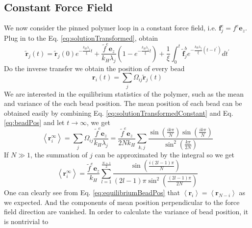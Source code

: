 \documentclass[12pt,a4paper]{article}
\begin{document}
\subsection{Constant Force Field}
\label{sub:constantForceField}
We now consider the pinned polymer loop in a constant force field, i.e.
$\mathbf{f}_j^e = f^e \mathbf{e}_z$. Plug in to the Eq.
\eqref{eq:solutionTransformed}, obtain
\begin{equation}
    \label{eq:solutionTransformedConstant}
    \tilde{\mathbf{r}}_j(t) = \tilde{\mathbf{r}}_j(0) e^{-\frac{k_H
            \lambda_j}{\xi} t} + \frac{\tilde{f}^e\mathbf{e}_z}{k_H
        \lambda_j}\left(1-e^{-\frac{k_H \lambda_j}{\xi} t} \right)
    +\frac{1}{\xi} \int^t_0{\tilde{\mathbf{f}}^b_j e^{-\frac{k_H \lambda_j}{\xi}
            (t -t^\prime)} }dt^{\prime}
\end{equation}
Do the inverse transfer we obtain the position of every bead
\begin{equation}
    \label{eq:beadPos}
    \mathbf{r}_i (t) = \sum_j \Omega_{ij} \tilde{\mathbf{r}}_j(t)
\end{equation}
We are interested in the equilibrium statistics of the polymer, such as the mean
and variance of the each bead position. The mean position of each bead can be
obtained easily by combining Eq.  \eqref{eq:solutionTransformedConstant} and Eq.
\eqref{eq:beadPos} and let $t\rightarrow\infty$, we get 
\begin{equation}
    \label{eq:equilibriumBeadPosRaw}
    \left<\mathbf{r}_i^\infty\right> = \sum_j \Omega_{ij}
    \frac{\tilde{f}^e\mathbf{e}_z}{k_H \lambda_j} =
    \frac{\tilde{f}^e\mathbf{e}_z}{2 N k_H}\sum_{k,j}
    \frac{\sin\left(\frac{ik\pi}{N}\right)\sin\left(\frac{ik\pi}{N}\right)}
    {\sin^2\left(\frac{k\pi}{2N}\right)}
\end{equation}
If $N\gg 1$, the summation of $j$ can be approximated by the integral so we get
\begin{equation}
    \label{eq:equilibriumBeadPos}
    \left<\mathbf{r}_i^\infty\right> = 
    \frac{\tilde{f}^e\mathbf{e}_z}{k_H}
    \sum_{l=1}^{\frac{N+1}{2}}\frac{\sin\left(\frac{i(2l-1)\pi}{N}\right)}
    {(2l-1)\pi\sin^2\left(\frac{(2l-1)\pi}{2N}\right)}
\end{equation}
One can clearly see from Eq. \eqref{eq:equilibriumBeadPos} that
$\left<\mathbf{r}_i\right> = \left<\mathbf{r}_{N-i}\right>$ as we expected. And
the components of mean position perpendicular to the force field direction are
vanished.
In order to calculate the variance of bead position, it is nontrivial to
\end{document}
